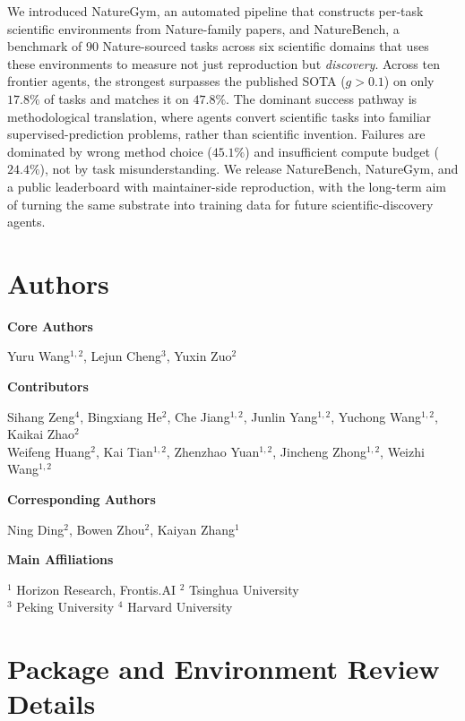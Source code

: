 \documentclass{llmxive}
\providecommand{\benchmark}{{\fontfamily{ppl}\selectfont NatureBench}\xspace}
\begin{document}
\noindent
We introduced NatureGym, an automated pipeline that constructs per-task scientific environments from Nature-family papers, and NatureBench, a benchmark of $90$ Nature-sourced tasks across six scientific domains that uses these environments to measure not just reproduction but \emph{discovery}.
Across ten frontier agents, the strongest surpasses the published SOTA ($g > 0.1$) on only $17.8\%$ of tasks and matches it on $47.8\%$.
The dominant success pathway is methodological translation, where agents convert scientific tasks into familiar supervised-prediction problems, rather than scientific invention. Failures are dominated by wrong method choice ($45.1\%$) and insufficient compute budget ($24.4\%$), not by task misunderstanding.
We release \benchmark, NatureGym, and a public leaderboard with maintainer-side reproduction, with the long-term aim of turning the same substrate into training data for future scientific-discovery agents.


\section{Authors}
\label{app:contributions}

\textbf{Core Authors}

Yuru Wang$^{1, 2}$, Lejun Cheng$^3$, Yuxin Zuo$^2$

\textbf{Contributors}

Sihang Zeng$^{4}$, Bingxiang He$^{2}$, Che Jiang$^{1, 2}$, Junlin Yang$^{1, 2}$, Yuchong Wang$^{1, 2}$, Kaikai Zhao$^{2}$ \\
Weifeng Huang$^{2}$, Kai Tian$^{1, 2}$, Zhenzhao Yuan$^{1, 2}$, Jincheng Zhong$^{1, 2}$, Weizhi Wang$^{1, 2}$

\textbf{Corresponding Authors}

Ning Ding$^{2}$, Bowen Zhou$^{2}$, Kaiyan Zhang$^{1}$



\textbf{Main Affiliations}

$^1$ Horizon Research, Frontis.AI \quad $^2$ Tsinghua University \\
$^3$ Peking University \quad $^4$ Harvard University






\appendix

\section{Package and Environment Review Details}
\label{app:package-review}
\end{document}

